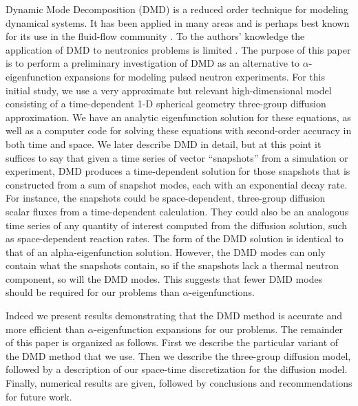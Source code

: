 \documentclass{style/nseJournal}
\begin{document}
Dynamic Mode Decomposition (DMD) is a reduced order technique for modeling dynamical systems.  
It has been applied in many areas and is perhaps best known for its use in the fluid-flow community 
\cite{kutz2016dynamic} \cite{schmid2010dynamic} \cite{jovanovic2012low}.  
To the authors' knowledge the application of DMD to neutronics problems is limited \cite{abdo2018data} \cite{mcclarren2018calculating}.  
The purpose of this paper is to perform a preliminary investigation of DMD as an alternative to $\alpha$-eigenfunction expansions for modeling pulsed neutron experiments.  
For this initial study, we use a very approximate but relevant high-dimensional model consisting of a time-dependent 1-D spherical geometry three-group diffusion approximation.  
We have an analytic eigenfunction solution for these equations, as well as a computer code for solving these equations with second-order accuracy in both time and space.  
We later describe DMD in detail, but at this point it suffices to say that given a time series of vector ``snapshots'' from a simulation or experiment, DMD produces a time-dependent solution for those snapshots that is constructed from a sum of snapshot modes, each with an exponential decay rate.  
For instance, the snapshots could be space-dependent, three-group diffusion scalar fluxes from a time-dependent calculation.  
They could also be an analogous time series of any quantity of interest computed from the diffusion solution, such as space-dependent reaction rates.  
The form of the DMD solution is identical to that of an alpha-eigenfunction solution.  
However, the DMD modes can only contain what the snapshots contain, so if the snapshots lack a thermal neutron component, so will the DMD modes.  
This suggests that fewer DMD modes should be required for our problems than $\alpha$-eigenfunctions.  

Indeed we present results demonstrating that the DMD method is accurate and more efficient than $\alpha$-eigenfunction expansions for our problems.  
The remainder of this paper is organized as follows.  
First we describe the particular variant of the DMD method that we use.  
Then we describe the three-group diffusion model, followed by a description of our space-time discretization for the diffusion model.  
Finally, numerical results are given, followed by conclusions and recommendations for future work.  
\end{document}
